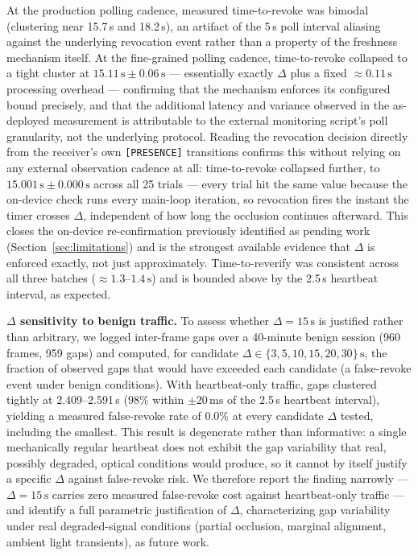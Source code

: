 \documentclass[conference]{IEEEtran}
\begin{document}
At the production polling cadence, measured time-to-revoke was bimodal (clustering near 15.7\,s and 18.2\,s), an artifact of the 5\,s poll interval aliasing against the underlying revocation event rather than a property of the freshness mechanism itself. At the fine-grained polling cadence, time-to-revoke collapsed to a tight cluster at $15.11\,\text{s} \pm 0.06\,\text{s}$ — essentially exactly $\Delta$ plus a fixed $\approx 0.11\,\text{s}$ processing overhead — confirming that the mechanism enforces its configured bound precisely, and that the additional latency and variance observed in the as-deployed measurement is attributable to the external monitoring script's poll granularity, not the underlying protocol. Reading the revocation decision directly from the receiver's own \texttt{[PRESENCE]} transitions confirms this without relying on any external observation cadence at all: time-to-revoke collapsed further, to $15.001\,\text{s} \pm 0.000\,\text{s}$ across all 25 trials — every trial hit the same value because the on-device check runs every main-loop iteration, so revocation fires the instant the timer crosses $\Delta$, independent of how long the occlusion continues afterward. This closes the on-device re-confirmation previously identified as pending work (Section~\ref{sec:limitations}) and is the strongest available evidence that $\Delta$ is enforced exactly, not just approximately. Time-to-reverify was consistent across all three batches ($\approx 1.3$--$1.4\,\text{s}$) and is bounded above by the 2.5\,s heartbeat interval, as expected.

\textbf{$\Delta$ sensitivity to benign traffic.} To assess whether $\Delta = 15\,\text{s}$ is justified rather than arbitrary, we logged inter-frame gaps over a 40-minute benign session (960 frames, 959 gaps) and computed, for candidate $\Delta \in \{3, 5, 10, 15, 20, 30\}\,\text{s}$, the fraction of observed gaps that would have exceeded each candidate (a false-revoke event under benign conditions). With heartbeat-only traffic, gaps clustered tightly at 2.409--2.591\,s (98\% within $\pm 20\,\text{ms}$ of the 2.5\,s heartbeat interval), yielding a measured false-revoke rate of 0.0\% at every candidate $\Delta$ tested, including the smallest. This result is degenerate rather than informative: a single mechanically regular heartbeat does not exhibit the gap variability that real, possibly degraded, optical conditions would produce, so it cannot by itself justify a specific $\Delta$ against false-revoke risk. We therefore report the finding narrowly — $\Delta = 15\,\text{s}$ carries zero measured false-revoke cost against heartbeat-only traffic — and identify a full parametric justification of $\Delta$, characterizing gap variability under real degraded-signal conditions (partial occlusion, marginal alignment, ambient light transients), as future work.
\end{document}
